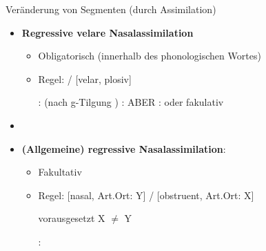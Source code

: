 %
%

\begin{frame}{Veränderung von Segmenten (durch Assimilation)}

\begin{itemize}
	\item \textbf{Regressive velare Nasalassimilation}

	\begin{itemize}
		\item Obligatorisch (innerhalb des phonologischen Wortes)
		\item Regel:  \ras \textipa{[N]} /  \underline{\quad} [velar, plosiv]

	\eal		
		\ex {}:  \ras {} (nach g-Tilgung \ras \textipa{[fy:.{\textscr}UN]})
		\ex {}:  \ras \textipa{[baNk]}
		\ex ABER :  \ras {} oder fakulativ 
	\zl
	
 	\end{itemize}


	\item[]
	\item \textbf{(Allgemeine) regressive Nasalassimilation}:

	\begin{itemize}
		\item Fakultativ
		\item Regel: [nasal, Art.Ort: Y]  /  \underline{\quad} [obstruent, Art.Ort: X]
		
		vorausgesetzt X $\neq$ Y

		\ea {}:  \ras \textipa{[fYmf]}
		\z
		
	\end{itemize}		

\end{itemize}

\end{frame}



